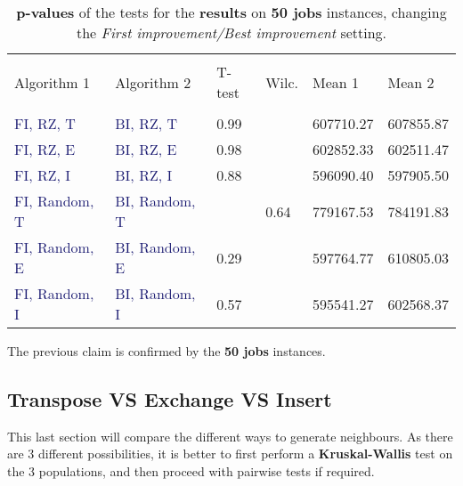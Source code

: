 \documentclass[
12pt,
a4paper,
oneside,
headinclude,
footinclude]{article}
\theoremstyle{definition} %
\begin{document}
\begin{table}[H]
    \begin{tabular}{l l l l l l} %
        \hline
        \hline 
        \\[-1.5ex]
        \textcolor{BrickRed}{Algorithm 1} & \textcolor{BrickRed}{Algorithm 2} & \textcolor{BrickRed}{T-test} & \textcolor{BrickRed}{Wilc.} & \textcolor{BrickRed}{Mean 1} & \textcolor{BrickRed}{Mean 2}\\ [0.5ex]
        \hline %
        \\[-1.5ex]
                
        \textcolor{MidnightBlue}{FI, RZ, T}     & \textcolor{MidnightBlue}{BI, RZ, T}     & 0.99 &  &  607710.27 & 607855.87 \\ 
        \textcolor{MidnightBlue}{FI, RZ, E}     & \textcolor{MidnightBlue}{BI, RZ, E}     & 0.98 &  &  602852.33 & 602511.47 \\ 
        \textcolor{MidnightBlue}{FI, RZ, I}     & \textcolor{MidnightBlue}{BI, RZ, I}     & 0.88 &  & 596090.40 & 597905.50 \\ 
        \textcolor{MidnightBlue}{FI, Random, T} & \textcolor{MidnightBlue}{BI, Random, T} &  & 0.64 &  779167.53 & 784191.83 \\ 
        \textcolor{MidnightBlue}{FI, Random, E} & \textcolor{MidnightBlue}{BI, Random, E} & 0.29 &  &  597764.77 & 610805.03 \\ 
        \textcolor{MidnightBlue}{FI, Random, I} & \textcolor{MidnightBlue}{BI, Random, I} & 0.57 &  &  595541.27 & 602568.37 \\ 
        [1ex] %
        \hline %
    \end{tabular}
    \caption{\label{tab:ii-ty50res}\textbf{p-values} of the tests for the \textbf{results} on \textbf{50 jobs} instances, changing the \textit{First improvement/Best improvement} setting.}
\end{table} 


The previous claim is confirmed by the \textbf{50 jobs} instances.



\subsection{Transpose VS Exchange VS Insert}
This last section will compare the different ways to generate neighbours. As there are 3 different possibilities, it is better to first perform a \textbf{Kruskal-Wallis} test on the 3 populations, and then proceed with pairwise tests if required.
\end{document}
